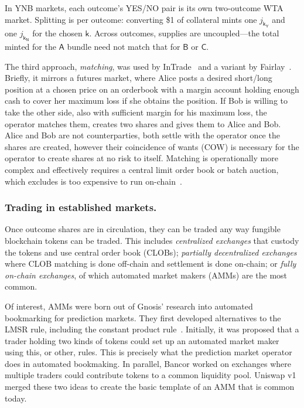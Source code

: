 In YNB markets, each outcome’s YES/NO pair is its own two-outcome WTA market. Splitting is per outcome: converting \$1 of collateral mints one $j_{\mathsf{k_Y}}$ and one $j_{\mathsf{k_N}}$ for the chosen $\mathsf{k}$. Across outcomes, supplies are uncoupled---the total minted for the $\mathsf{A}$ bundle need not match that for $\mathsf{B}$ or $\mathsf{C}$. 

The third approach, \textit{matching}, was used by InTrade~\cite{intrade} and a variant by Fairlay~\cite{fairlay}. Briefly, it mirrors a futures market, where Alice posts a desired short/long position at a chosen price on an orderbook with a margin account holding enough cash to cover her maximum loss if she obtains the position. If Bob is willing to take the other side, also with sufficient margin for his maximum loss, the operator matches them, creates two shares and gives them to Alice and Bob. Alice and Bob are not counterparties, both settle with the operator once the shares are created, however their coincidence of wants (COW) is necessary for the operator to create shares at no risk to itself. Matching is operationally more complex and effectively requires a central limit order book or batch auction, which excludes is too expensive to run on-chain~\cite{MoCl23}. 


\subsubsection{Trading in established markets.}

Once outcome shares are in circulation, they can be traded any way fungible blockchain tokens can be traded. This includes \textit{centralized exchanges} that custody the tokens and use central order book (CLOBs); \textit{partially decentralized exchanges} where CLOB matching is done off-chain and settlement is done on-chain; or \textit{fully on-chain exchanges}, of which automated market makers (AMMs) are the most common. 

Of interest, AMMs were born out of Gnosis' research into automated bookmarking for prediction markets. They first developed alternatives to the LMSR rule, including the constant product rule~\cite{LK17}. Initially, it was proposed that a trader holding two kinds of tokens could set up an automated market maker using this, or other, rules. This is precisely what the prediction market operator does in automated bookmaking. In parallel, Bancor worked on exchanges where multiple traders could contribute tokens to a common liquidity pool. Uniswap v1 merged these two ideas to create the basic template of an AMM that is common today.

